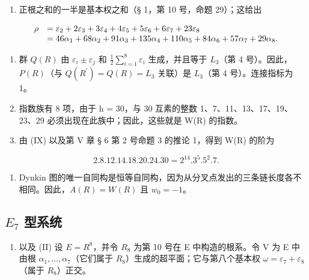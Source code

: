 \begin{enumerate}
\def\labelenumi{(\Roman{enumi})}
\setcounter{enumi}{6}
\tightlist
\item
  正根之和的一半是基本权之和（§ 1，第 10 号，命题 29）；这给出
\end{enumerate}

\[
\begin{array}{r l} \rho & = \varepsilon_ {2} + 2 \varepsilon_ {3} + 3 \varepsilon_ {4} + 4 \varepsilon_ {5} + 5 \varepsilon_ {6} + 6 \varepsilon_ {7} + 23 \varepsilon_ {8} \\ & = 46 \alpha_ {1} + 68 \alpha_ {2} + 91 \alpha_ {3} + 135 \alpha_ {4} + 110 \alpha_ {5} + 84 \alpha_ {6} + 57 \alpha_ {7} + 29 \alpha_ {8}. \end{array}
\]

\begin{enumerate}
\def\labelenumi{(\Roman{enumi})}
\setcounter{enumi}{7}
\item
  群 \(Q(R)\) 由 \(\varepsilon_{i} \pm \varepsilon_{j}\) 和 \(\frac{1}{2} \sum_{i=1}^{8} \varepsilon_{i}\) 生成，并且等于 \(L_{3}\)（第 4 号）。因此，\(P(R)\)（与 \(Q(R^{\prime}) = Q(R) = L_{3}\) 关联）是 \(L_{3}\)（第 4 号）。连接指标为 1。
\item
  指数族有 8 项，由于 h = 30，与 30 互素的整数 1、7、11、13、17、19、23、29 必须出现在此族中；因此，这些就是 W(R) 的指数。
\item
  由 (IX) 以及第 V 章 § 6 第 2 号命题 3 的推论 1，得到 W(R) 的阶为
\end{enumerate}

\[
2. 8. 12. 14. 18. 20. 24. 30 = 2 ^ {14}. 3 ^ {5}. 5 ^ {2}. 7.
\]

\begin{enumerate}
\def\labelenumi{(\Roman{enumi})}
\setcounter{enumi}{10}
\tightlist
\item
  Dynkin 图的唯一自同构是恒等自同构，因为从分叉点发出的三条链长度各不相同。因此，\(A(R) = W(R)\) 且 \(w_{0} = -1\)。
\end{enumerate}

\subsection{\texorpdfstring{\(E_{7}\) 型系统}{E\_7 型系统}}

\begin{enumerate}
\def\labelenumi{(\Roman{enumi})}
\tightlist
\item
  以及 (II) 设 \(E = R^{8}\)，并令 \(R_{8}\) 为第 10 号在 E 中构造的根系。令 V 为 E 中由根 \(\alpha_{1}, \ldots, \alpha_{7}\)（它们属于 \(R_{8}\)）生成的超平面；它与第八个基本权 \(\omega = \varepsilon_{7} + \varepsilon_{8}\)（属于 \(R_{8}\)）正交。
\end{enumerate}

